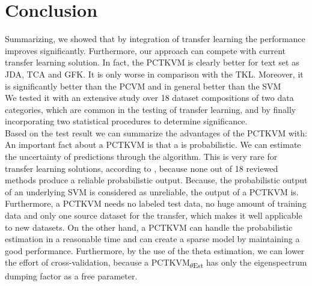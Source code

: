 \section{Conclusion}\label{EmSecConc}
Summarizing, we showed that by integration of transfer learning the performance improves significantly. Furthermore, our approach can compete with current transfer learning solution.
In fact, the \acs{PCTKVM} is clearly better for text set as \acs{JDA}, \acs{TCA} and \acs{GFK}.
It is only worse in comparison with the \acs{TKL}.
Moreover, it is significantly better than the \acs{PCVM} and in general better than the \acs{SVM} \\
We tested it with an extensive study over 18 dataset compositions of two data categories, which are common in the testing of transfer learning, and by finally incorporating two statistical procedures to determine significance.\\
Based on the test result we can summarize the advantages of the \acs{PCTKVM} with:
An important fact about a \acs{PCTKVM} is that a is probabilistic. We can estimate the uncertainty of predictions through the algorithm.
This is very rare for transfer learning solutions, according to \cite{Weiss.2016}, because none out of 18 reviewed methods produce a reliable probabilistic output.
Because, the probabilistic output of an underlying \acs{SVM} is considered as unreliable\cite{Tipping.2001}, the output of a \acs{PCTKVM} is.\cite{Chen.2009}
Furthermore, a \acs{PCTKVM} needs no labeled test data, no huge amount of training data and only one source dataset for the transfer, which makes it well applicable to new datasets.
On the other hand, a \acs{PCTKVM} can handle the probabilistic estimation in a reasonable time and can create a sparse model by maintaining a good performance.
Furthermore, by the use of the theta estimation, we can lower the effort of cross-validation, because a \acs{PCTKVM}\textsubscript{$\theta$Est} has only the eigenspectrum dumping factor as a free parameter.

